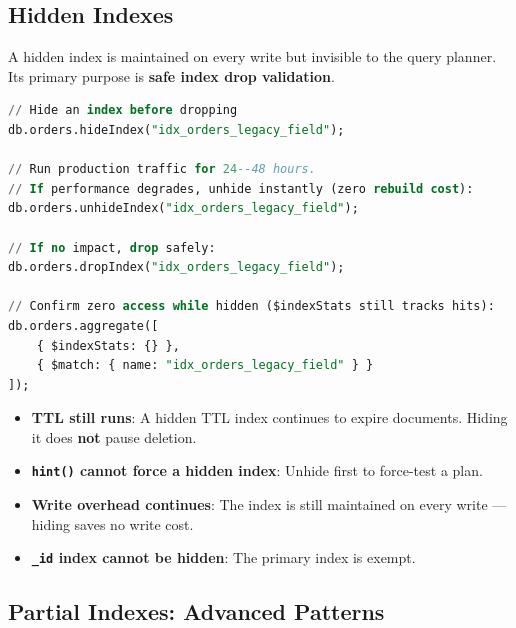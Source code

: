 \documentclass[12pt,a4paper]{article}
\begin{document}
\subsection{Hidden Indexes}

A hidden index is maintained on every write but invisible to the query planner. Its primary purpose is \textbf{safe index drop validation}.

\begin{lstlisting}[language=SQL, caption={Hidden index safe-drop workflow}]
// Hide an index before dropping
db.orders.hideIndex("idx_orders_legacy_field");

// Run production traffic for 24--48 hours.
// If performance degrades, unhide instantly (zero rebuild cost):
db.orders.unhideIndex("idx_orders_legacy_field");

// If no impact, drop safely:
db.orders.dropIndex("idx_orders_legacy_field");

// Confirm zero access while hidden ($indexStats still tracks hits):
db.orders.aggregate([
    { $indexStats: {} },
    { $match: { name: "idx_orders_legacy_field" } }
]);
\end{lstlisting}

\begin{tipbox}
\begin{itemize}
    \item \textbf{TTL still runs}: A hidden TTL index continues to expire documents. Hiding it does \textbf{not} pause deletion.
    \item \textbf{\texttt{hint()} cannot force a hidden index}: Unhide first to force-test a plan.
    \item \textbf{Write overhead continues}: The index is still maintained on every write --- hiding saves no write cost.
    \item \textbf{\texttt{\_id} index cannot be hidden}: The primary index is exempt.
\end{itemize}
\end{tipbox}

\subsection{Partial Indexes: Advanced Patterns}
\end{document}
